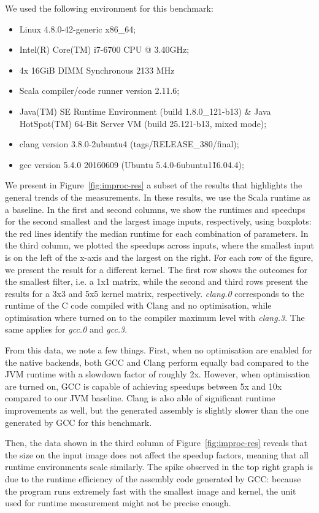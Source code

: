 \documentclass[a4paper,twoside]{article}
\newcommand{\RefFig}[1]{Figure~\ref{#1}}
\begin{document}
\pagebreak
We used the following environment for this benchmark:
\begin{itemize}
\item Linux 4.8.0-42-generic x86\_64;
\item Intel(R) Core(TM) i7-6700 CPU @ 3.40GHz;
\item 4x 16GiB DIMM Synchronous 2133 MHz
\item Scala compiler/code runner version 2.11.6;
\item Java(TM) SE Runtime Environment (build 1.8.0\_121-b13) \&
      Java HotSpot(TM) 64-Bit Server VM (build 25.121-b13, mixed mode);
\item clang version 3.8.0-2ubuntu4 (tags/RELEASE\_380/final);
\item gcc version 5.4.0 20160609 (Ubuntu 5.4.0-6ubuntu1\~16.04.4);
\end{itemize}

We present in \RefFig{fig:improc-res} a subset of the results that highlights
the general trends of the measurements. In these results, we use the Scala
runtime as a baseline. In the first and second columns, we show the runtimes and
speedups for the second smallest and the largest image inputs, respectively,
using boxplots: the red lines identify the median runtime for each combination
of parameters. In the third column, we plotted the speedups across inputs, where
the smallest input is on the left of the x-axis and the largest on the right.
For each row of the figure, we present the result for a different kernel. The
first row shows the outcomes for the smallest filter, i.e. a 1x1 matrix, while
the second and third rows present the results for a 3x3 and 5x5 kernel matrix,
respectively. \emph{clang.0} corresponds to the runtime of the C code compiled
with Clang and no optimisation, while optimisation where turned on to the
compiler maximum level with \emph{clang.3}. The same applies for \emph{gcc.0}
and \emph{gcc.3}.

From this data, we note a few things. First, when no optimisation are enabled
for the native backends, both GCC and Clang perform equally bad compared to the
JVM runtime with a slowdown factor of roughly 2x. However, when optimisation are
turned on, GCC is capable of achieving speedups between 5x and 10x compared to
our JVM baseline. Clang is also able of significant runtime improvements as
well, but the generated assembly is slightly slower than the one generated by
GCC for this benchmark.

Then, the data shown in the third column of \RefFig{fig:improc-res} reveals that
the size on the input image does not affect the speedup factors, meaning that
all runtime environments scale similarly. The spike observed in the top right
graph is due to the runtime efficiency of the assembly code generated by GCC:
because the program runs extremely fast with the smallest image and kernel, the
unit used for runtime measurement might not be precise enough.
\end{document}
